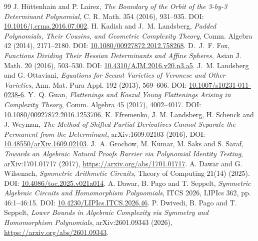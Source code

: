 \documentclass[11pt]{article}
\theoremstyle{definition}
\theoremstyle{remark}
\begin{document}
\begin{thebibliography}{99}
 J. H{\"u}ttenhain and P. Lairez, \emph{The Boundary of the Orbit of the 3-by-3 Determinant Polynomial}, C. R. Math. 354 (2016), 931--935. DOI: \href{https://doi.org/10.1016/j.crma.2016.07.002}{10.1016/j.crma.2016.07.002}.
 H. Kadish and J.~M. Landsberg, \emph{Padded Polynomials, Their Cousins, and Geometric Complexity Theory}, Comm. Algebra 42 (2014), 2171--2180. DOI: \href{https://doi.org/10.1080/00927872.2012.758268}{10.1080/00927872.2012.758268}.
 D.~J.~F. Fox, \emph{Functions Dividing Their Hessian Determinants and Affine Spheres}, Asian J. Math. 20 (2016), 503--530. DOI: \href{https://doi.org/10.4310/AJM.2016.v20.n3.a5}{10.4310/AJM.2016.v20.n3.a5}.
 J.~M. Landsberg and G. Ottaviani, \emph{Equations for Secant Varieties of Veronese and Other Varieties}, Ann. Mat. Pura Appl. 192 (2013), 569--606. DOI: \href{https://doi.org/10.1007/s10231-011-0238-6}{10.1007/s10231-011-0238-6}.
 Y.~Q. Guan, \emph{Flattenings and Koszul Young Flattenings Arising in Complexity Theory}, Comm. Algebra 45 (2017), 4002--4017. DOI: \href{https://doi.org/10.1080/00927872.2016.1253706}{10.1080/00927872.2016.1253706}.
 K. Efremenko, J. M. Landsberg, H. Schenck and J. Weyman, \emph{The Method of Shifted Partial Derivatives Cannot Separate the Permanent from the Determinant}, arXiv:1609.02103 (2016), DOI: \href{https://doi.org/10.48550/arXiv.1609.02103}{10.48550/arXiv.1609.02103}.
 J.~A. Grochow, M. Kumar, M. Saks and S. Saraf, \emph{Towards an Algebraic Natural Proofs Barrier via Polynomial Identity Testing}, arXiv:1701.01717 (2017), \url{https://arxiv.org/abs/1701.01717}.
 A. Dawar and G. Wilsenach, \emph{Symmetric Arithmetic Circuits}, Theory of Computing 21(14) (2025). DOI: \href{https://doi.org/10.4086/toc.2025.v021a014}{10.4086/toc.2025.v021a014}.
 A. Dawar, B. Pago and T. Seppelt, \emph{Symmetric Algebraic Circuits and Homomorphism Polynomials}, ITCS 2026, LIPIcs 362, pp. 46:1--46:15. DOI: \href{https://doi.org/10.4230/LIPIcs.ITCS.2026.46}{10.4230/LIPIcs.ITCS.2026.46}.
 P. Dwivedi, B. Pago and T. Seppelt, \emph{Lower Bounds in Algebraic Complexity via Symmetry and Homomorphism Polynomials}, arXiv:2601.09343 (2026), \url{https://arxiv.org/abs/2601.09343}.
\end{thebibliography}
\end{document}
